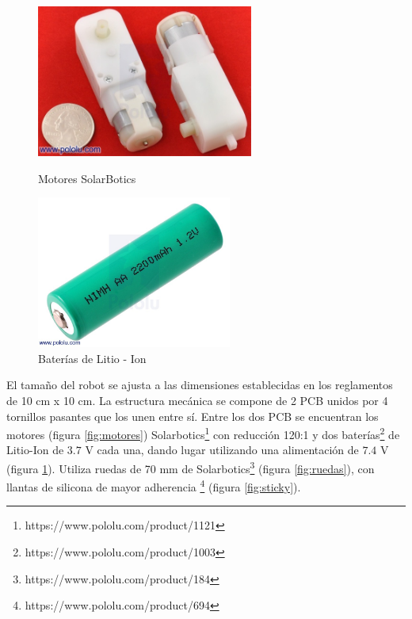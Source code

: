 \documentclass[12pt,a4paper]{article}
\begin{document}
\begin{figure}[h]
\centering
\begin{minipage}{0.45\textwidth}
\centering
  \includegraphics[height=5cm]{img/motores}
  \vspace{-0.3cm}
  \caption{Motores SolarBotics}
  \label{fig:motores}
\end{minipage}\hfill
\begin{minipage}{0.45\textwidth}
  \centering
  \includegraphics[height=5cm]{img/pila}
  \vspace{-0.3cm}
  \caption{Baterías de Litio - Ion}
  \label{fig:pilas}
\end{minipage}
\end{figure}

El tamaño del robot se ajusta a las dimensiones establecidas en los reglamentos de 10 cm x 10 cm.
La estructura mecánica se compone de 2 PCB unidos por 4 tornillos pasantes que los unen entre sí.
Entre los dos PCB se encuentran los motores (figura \ref{fig:motores})
Solarbotics\footnote{https://www.pololu.com/product/1121} con reducción 120:1 y 
dos baterías\footnote{https://www.pololu.com/product/1003} de Litio-Ion de $3.7$ V cada una, dando lugar utilizando una alimentación de $7.4$ V (figura \ref{fig:pilas}).
Utiliza ruedas de 70 mm de Solarbotics\footnote{https://www.pololu.com/product/184} (figura \ref{fig:ruedas}), 
con llantas de silicona de mayor adherencia \footnote{https://www.pololu.com/product/694} (figura \ref{fig:sticky}).
\end{document}
